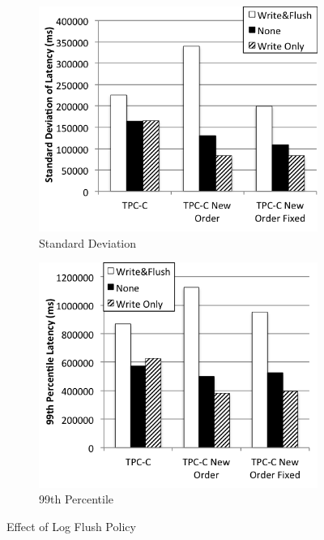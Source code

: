 \begin{figure}
    \begin{subfigure}[t]{0.24\textwidth}
        \includegraphics[width=\textwidth]{plots/log_flush/std}
        \caption{Standard Deviation}
        \label{fig:commit-std-mean}
    \end{subfigure}
    \begin{subfigure}[t]{0.24\textwidth}
        \includegraphics[width=\textwidth]{plots/log_flush/99}
        \caption{99th Percentile}
        \label{fig:commit-99-mean}
    \end{subfigure}
\caption{Effect of Log Flush Policy}
\label{fig:log_flush}
\end{figure}

